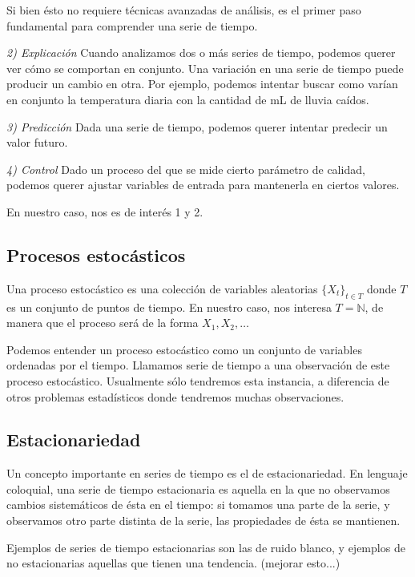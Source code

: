 Si bien ésto no requiere técnicas avanzadas de análisis, es el primer paso fundamental para comprender una serie de tiempo.


\emph{2) Explicación} Cuando analizamos dos o más series de tiempo, podemos querer ver cómo se comportan en conjunto. Una variación en una serie de tiempo puede producir un cambio en otra. Por ejemplo, podemos intentar buscar como varían en conjunto la temperatura diaria con la cantidad de mL de lluvia caídos.

\emph{3) Predicción} Dada una serie de tiempo, podemos querer intentar predecir un valor futuro.

\emph{4) Control} Dado un proceso del que se mide cierto parámetro de calidad, podemos querer ajustar variables de entrada para mantenerla en ciertos valores.

En nuestro caso, nos es de interés 1 y 2.


\subsection{Procesos estocásticos}

\begin{definicion}
Una proceso estocástico es una colección de variables aleatorias $\{X_t \}_{t \in T}$ donde $T$ es un conjunto de puntos de tiempo. En nuestro caso, nos interesa $T = \mathbb{N}$, de manera que el proceso será de la forma $X_1, X_2, \ldots $
\end{definicion}

Podemos entender un proceso estocástico como un conjunto de variables ordenadas por el tiempo. Llamamos serie de tiempo a una observación de este proceso estocástico. Usualmente sólo tendremos esta instancia, a diferencia de otros problemas estadísticos donde tendremos muchas observaciones.


\subsection{Estacionariedad}

Un concepto importante en series de tiempo es el de estacionariedad. En lenguaje coloquial, una serie de tiempo estacionaria es aquella en la que no observamos cambios sistemáticos de ésta en el tiempo: si tomamos una parte de la serie, y observamos otro parte distinta de la serie, las propiedades de ésta se mantienen.

Ejemplos de series de tiempo estacionarias son las de ruido blanco, y ejemplos de no estacionarias aquellas que tienen una tendencia. (mejorar esto...)

